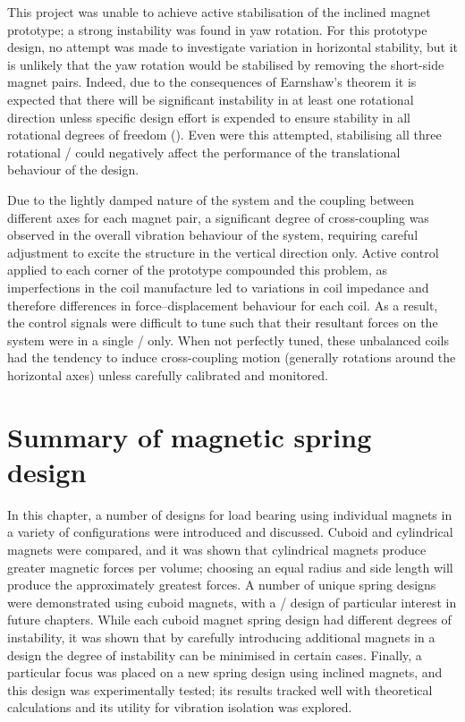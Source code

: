 \documentclass[11pt,a4paper]{memoir}
\begin{document}
This project was unable to achieve active stabilisation of the inclined magnet prototype; a strong instability was found in yaw rotation.
For this prototype design, no attempt was made to investigate variation in horizontal stability, but it is unlikely that the yaw rotation would be stabilised by removing the short-side magnet pairs.
Indeed, due to the consequences of Earnshaw's theorem it is expected that there will be significant instability in at least one rotational direction unless specific design effort is expended to ensure stability in all rotational degrees of freedom ().
Even were this attempted, stabilising all three rotational \dofs/ could negatively affect the performance of the translational behaviour of the design.

Due to the lightly damped nature of the system and the coupling between different axes for each magnet pair, a significant degree of cross-coupling was observed in the overall vibration behaviour of the system, requiring careful adjustment to excite the structure in the vertical direction only.
Active control applied to each corner of the prototype compounded this problem, as imperfections in the coil manufacture led to variations in coil impedance and therefore differences in force--displacement behaviour for each coil.
As a result, the control signals were difficult to tune such that their resultant forces on the system were in a single \dof/ only.
When not perfectly tuned, these unbalanced coils had the tendency to induce cross-coupling motion (generally rotations around the horizontal axes) unless carefully calibrated and monitored.

\section{Summary of magnetic spring design}

In this chapter, a number of designs for load bearing using individual magnets in a variety of configurations were introduced and discussed.
Cuboid and cylindrical magnets were compared, and it was shown that cylindrical magnets produce greater magnetic forces per volume; choosing an equal radius and side length will produce the approximately greatest forces.
A number of unique spring designs were demonstrated using cuboid magnets, with a \qzs/ design of particular interest in future chapters.
While each cuboid magnet spring design had different degrees of instability, it was shown that by carefully introducing additional magnets in a design the degree of instability can be minimised in certain cases.
Finally, a particular focus was placed on a new spring design using inclined magnets, and this design was experimentally tested; its results tracked well with theoretical calculations and its utility for vibration isolation was explored.
\end{document}
